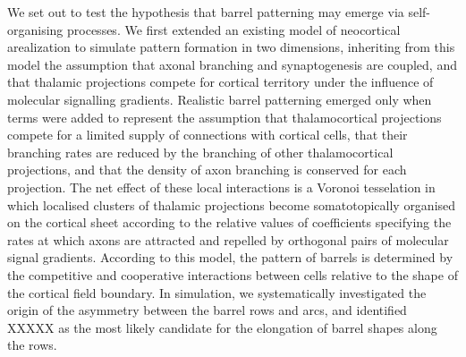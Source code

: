 \documentclass[9pt,twocolumn,twoside,lineno]{pnas-new}
\begin{document}
We set out to test the hypothesis that barrel patterning may emerge via
self-organising processes. We first extended an existing model of neocortical
arealization to simulate pattern formation in two dimensions, inheriting from
this model the assumption that axonal branching and synaptogenesis are
coupled, and that thalamic projections compete for cortical territory under
the influence of molecular signalling gradients. Realistic barrel patterning
emerged only when terms were added to represent the assumption that
thalamocortical projections compete for a limited supply of connections with
cortical cells, that their branching rates are reduced by the branching of
other thalamocortical projections, and that the density of axon branching is
conserved for each projection. The net effect of these local interactions is a
Voronoi tesselation in which localised clusters of thalamic projections become
somatotopically organised on the cortical sheet according to the relative
values of coefficients specifying the rates at which axons are attracted and
repelled by orthogonal pairs of molecular signal gradients. According to this
model, the pattern of barrels is determined by the competitive and cooperative
interactions between cells relative to the shape of the cortical field
boundary. In simulation, we systematically investigated the origin of the
asymmetry between the barrel rows and arcs, and identified {\color{red} XXXXX}
as the most likely candidate for the elongation of barrel shapes along the
rows.


\end{document}
